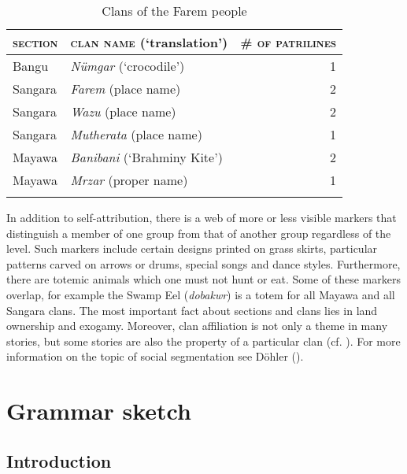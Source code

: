 \begin{table}
\caption{Clans of the Farem people}
\label{tab:clans}
\centering
	\begin{tabularx}{.75\textwidth}{llr}
	\lsptoprule
		\textsc{section}&\textsc{clan name} (`translation')&\textsc{\# of patrilines}\\
		\midrule 
		Bangu&\emph{Nümgar} (`crocodile')&1\\
		Sangara&\emph{Farem} (place name)&2\\
		Sangara&\emph{Wazu} (place name)&2\\
		Sangara&\emph{Mutherata} (place name)&1\\
		Mayawa&\emph{Banibani} (`Brahminy Kite')&2\\
		Mayawa&\emph{Mrzar} (proper name)&1\\
	\lspbottomrule
	\end{tabularx}
\end{table}%

In addition to self-attribution, there is a web of more or less visible markers that distinguish a member of one group from that of another group regardless of the level. Such markers include certain designs printed on grass skirts, particular patterns carved on arrows or drums, special songs and dance styles. Furthermore, there are totemic animals which one must not hunt or eat. Some of these markers overlap, for example the Swamp Eel (\textit{dobakwr}) is a totem for all Mayawa and all Sangara clans. The most important fact about sections and clans lies in land ownership and exogamy. Moreover, clan affiliation is not only a theme in many stories, but some stories are also the property of a particular clan (cf. ). For more information on the topic of social segmentation see Döhler (\citeyear[26ff.]{Dohler:2018qt}).

\section{Grammar sketch}\label{sec:typoloverview}

\subsection{Introduction}


